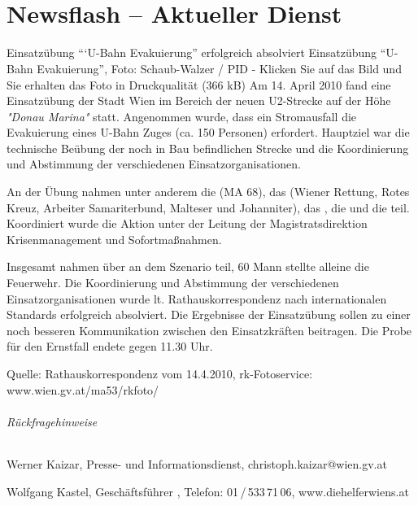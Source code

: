 \chapter
[\CO{[NEW]} Newsflash -- Aktueller Dienst]
{\CC{[NEW]}\\Newsflash -- Aktueller Dienst}

\begin{NewsItem}{}{Einsatzübung \enquote{`U-Bahn Evakuierung} erfolgreich absolviert}
{}
{{Einsatzübung  \enquote{U-Bahn Evakuierung}, Foto: Schaub-Walzer / PID - Klicken Sie
auf das Bild und Sie erhalten das Foto in Druckqualität (366 kB)}}
{}
 Am 14. April 2010 fand eine Einsatzübung der Stadt Wien im Bereich der
neuen U2-Strecke auf der Höhe \emph{"Donau Marina"} statt. Angenommen wurde, dass
ein Stromausfall die Evakuierung eines U-Bahn Zuges (ca. 150 Personen) erfordert.
Hauptziel war die technische Beübung der noch in Bau befindlichen Strecke und die
Koordinierung und Abstimmung der verschiedenen Einsatzorganisationen.

An der Übung nahmen unter anderem die  (MA 68), das
 (Wiener Rettung, Rotes Kreuz, Arbeiter Samariterbund,
Malteser und Johanniter), das , die
 und die  teil. Koordiniert wurde
die Aktion unter der Leitung der Magistratsdirektion Krisenmanagement und
Sofortmaßnahmen.

Insgesamt nahmen über  an dem Szenario teil, 60 Mann stellte
alleine die Feuerwehr. Die Koordinierung und Abstimmung der verschiedenen
Einsatzorganisationen wurde lt. Rathauskorrespondenz nach internationalen
Standards erfolgreich absolviert. Die Ergebnisse der Einsatzübung sollen zu einer
noch besseren Kommunikation zwischen den Einsatzkräften beitragen. Die Probe für
den Ernstfall endete gegen 11.30 Uhr.
 
Quelle: Rathauskorrespondenz vom 14.4.2010, rk-Fotoservice:
www.wien.gv.at/ma53/rkfoto/

\subparagraph{Rückfragehinweise}
\begin{compactdesc}
  \scriptsize
  \item[Stadt Wien] Werner Kaizar, Presse- und Informationsdienst,  christoph.kaizar@wien.gv.at
  \item[Die Helfer Wiens] Wolfgang Kastel, Geschäftsführer , Telefon:
  01\,/\,533\,71\,06, www.diehelferwiens.at
\end{compactdesc}
\end{NewsItem}

